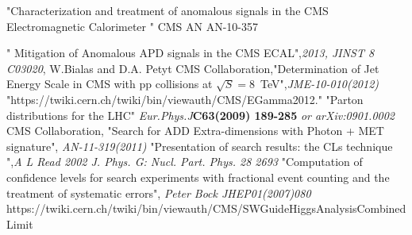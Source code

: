 \begin{thebibliography}{9}
 "Characterization and treatment of anomalous signals in the CMS Electromagnetic Calorimeter " CMS AN AN-10-357

 " Mitigation of Anomalous APD signals in the CMS ECAL",\textit{2013, JINST 8 C03020}, W.Bialas and D.A. Petyt
 CMS Collaboration,"Determination of Jet Energy Scale in CMS with pp collisions at $\sqrt{S} = 8$~TeV",\textit{JME-10-010(2012)}
 "https://twiki.cern.ch/twiki/bin/viewauth/CMS/EGamma2012."
 "Parton distributions for the LHC" \textit{Eur.Phys.J}\textbf{C63(2009) 189-285} \textit{or arXiv:0901.0002}
 CMS Collaboration, "Search for ADD Extra-dimensions with Photon + MET signature", \textit{AN-11-319(2011)}
 "Presentation of search results: the CLs technique ",\textit{A L Read 2002 J. Phys. G: Nucl. Part. Phys. 28 2693}
 "Computation of confidence levels for search experiments with fractional event counting and the treatment of systematic errors", \textit{Peter Bock JHEP01(2007)080}
 https://twiki.cern.ch/twiki/bin/viewauth/CMS/SWGuideHiggsAnalysisCombinedLimit

\end{thebibliography}